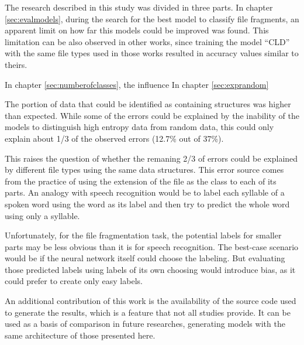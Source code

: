 The research described in this study was divided in three parts.
In chapter \ref{sec:evalmodels}, during the search for the best model to classify file fragments, an apparent limit on how far this models could be improved was found. This limitation can be also observed in other works, since training the model ``CLD'' with the same file types used in those works resulted in accuracy values similar to theirs.

In chapter \ref{sec:numberofclasses}, the influence
In chapter \ref{sec:exprandom}


The portion of data that could be identified as containing structures was higher than expected. While some of the errors could be explained by the inability of the models to distinguish  high entropy data from random data, this could only explain about 1/3 of the observed errors (12.7\% out of 37\%).

This raises the question of whether the remaning 2/3 of errors could be explained by different file types using the same data structures. This error source comes from the practice of using the extension of the file as the class to each of its parts. An analogy with speech recognition would be to label each syllable of a spoken word using the word as its label and then try to predict the whole word using only a syllable.

Unfortunately, for the file fragmentation task, the potential labels for smaller parts may be less obvious than it is for speech recognition. The best-case scenario would be if the neural network itself could choose the labeling. But evaluating those predicted labels using labels of its own choosing would introduce bias, as it could prefer to create only easy labels.

An additional contribution of this work is the availability of the source code used to generate the results, which is a feature that not all studies provide. It can be used as a basis of comparison in future researches, generating models with the same architecture of those presented here.